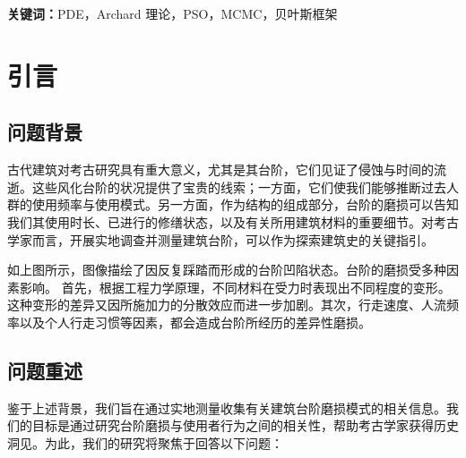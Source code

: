 \documentclass[11pt,a4paper,fontset=windows]{ctexart}
\begin{document}
\vspace{0.6em}
\noindent\textbf{关键词：}PDE，Archard 理论，PSO，MCMC，贝叶斯框架

\newpage

\section{引言}

\subsection{问题背景}

古代建筑对考古研究具有重大意义，尤其是其台阶，它们见证了侵蚀与时间的流逝。这些风化台阶的状况提供了宝贵的线索\cite{1}；一方面，它们使我们能够推断过去人群的使用频率与使用模式。另一方面，作为结构的组成部分，台阶的磨损可以告知我们其使用时长、已进行的修缮状态，以及有关所用建筑材料的重要细节。对考古学家而言，开展实地调查并测量建筑台阶，可以作为探索建筑史的关键指引。

如上图所示，图像描绘了因反复踩踏而形成的台阶凹陷状态。台阶的磨损受多种因素影响。\cite{2} 首先，根据工程力学原理，不同材料在受力时表现出不同程度的变形。这种变形的差异又因所施加力的分散效应而进一步加剧。其次，行走速度、人流频率以及个人行走习惯等因素，都会造成台阶所经历的差异性磨损。

\subsection{问题重述}

鉴于上述背景，我们旨在通过实地测量收集有关建筑台阶磨损模式的相关信息。我们的目标是通过研究台阶磨损与使用者行为之间的相关性，帮助考古学家获得历史洞见。为此，我们的研究将聚焦于回答以下问题：
\end{document}
